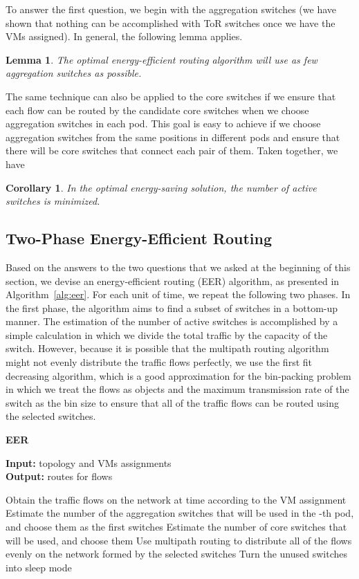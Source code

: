 \documentclass[journal,single-space,two column,twoside,10pt]{IEEEtran}
\newtheorem{lemma}{Lemma}
\newtheorem{corollary}{Corollary}
\begin{document}
To answer the first question, we begin with the aggregation switches (we have shown that nothing can be accomplished with ToR switches once we have the VMs assigned). In general, the following lemma applies.

\begin{lemma}
The optimal energy-efficient routing algorithm will use as few aggregation switches as possible.
\end{lemma}

The same technique can also be applied to the core switches if we ensure that each flow can be routed by the candidate core switches when we choose aggregation switches in each pod. This goal is easy to achieve if we choose aggregation switches from the same positions in different pods and ensure that there will be core switches that connect each pair of them. Taken together, we have
\begin{corollary}
\label{cor:eer}
In the optimal energy-saving solution, the number of active switches is minimized.
\end{corollary}

\subsection{Two-Phase Energy-Efficient Routing}

Based on the answers to the two questions that we asked at the beginning of this section, we devise an energy-efficient routing (EER) algorithm, as presented in Algorithm~\ref{alg:eer}. For each unit of time, we repeat the following two phases. In the first phase, the algorithm aims to find a subset of switches in a bottom-up manner. The estimation of the number of active switches is accomplished by a simple calculation in which we divide the total traffic by the capacity of the switch. However, because it is possible that the multipath routing algorithm might not evenly distribute the traffic flows perfectly, we use the first fit decreasing algorithm, which is a good approximation for the bin-packing problem in which we treat the flows as objects and the maximum transmission rate of the switch as the bin size to ensure that all of the traffic flows can be routed using the selected switches.

\begin{algorithm}[!t]
\caption{\label{alg:eer} \textbf{EER}}
\textbf{Input: } topology  and VMs assignments\\
\textbf{Output: } routes for flows

\begin{algorithmic}[1]
\FOR{}
\STATE Obtain the traffic flows on the network at time  according to the VM assignment
\FOR{}
	\STATE Estimate the number  of the aggregation switches that will be used in the -th pod, and choose them as the first  switches
\ENDFOR
\STATE Estimate the number  of core switches that will be used, and choose them
\STATE Use multipath routing to distribute all of the flows evenly on the network formed by the selected switches
\STATE Turn the unused switches into sleep mode
\ENDFOR
\end{algorithmic}
\end{algorithm}
\end{document}
